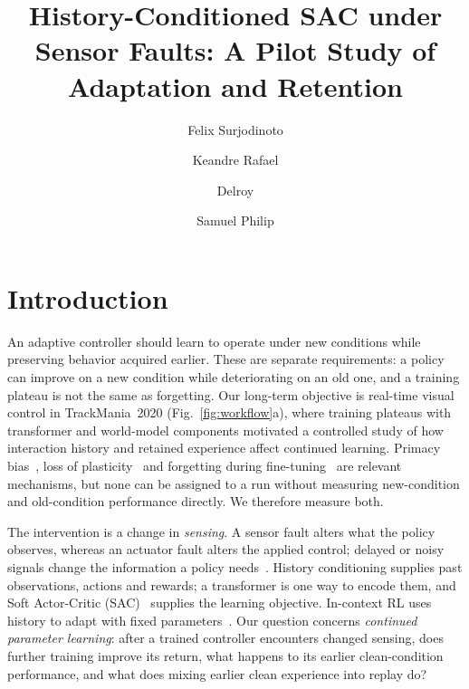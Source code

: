 \documentclass[runningheads]{llncs}
\begin{document}
\title{History-Conditioned SAC under Sensor Faults: A Pilot Study of Adaptation and Retention}
\author{Felix Surjodinoto \and Keandre Rafael \and Delroy \and Samuel Philip}
\authorrunning{\mbox{}}
\maketitle

\begin{abstract}

\end{abstract}

\section{Introduction}
An adaptive controller should learn to operate under new conditions while preserving behavior acquired earlier. These are separate requirements: a policy can improve on a new condition while deteriorating on an old one, and a training plateau is not the same as forgetting. Our long-term objective is real-time visual control in TrackMania~2020 (Fig.~\ref{fig:workflow}a), where training plateaus with transformer and world-model components motivated a controlled study of how interaction history and retained experience affect continued learning. Primacy bias~\cite{primacy}, loss of plasticity~\cite{plasticity} and forgetting during fine-tuning~\cite{finetuneforget} are relevant mechanisms, but none can be assigned to a run without measuring new-condition and old-condition performance directly. We therefore measure both.

The intervention is a change in \emph{sensing}. A sensor fault alters what the policy observes, whereas an actuator fault alters the applied control; delayed or noisy signals change the information a policy needs~\cite{signaldelay}. History conditioning supplies past observations, actions and rewards; a transformer is one way to encode them, and Soft Actor-Critic (SAC)~\cite{sac} supplies the learning objective. In-context RL uses history to adapt with fixed parameters~\cite{rl2,amago,ad}. Our question concerns \emph{continued parameter learning}: after a trained controller encounters changed sensing, does further training improve its return, what happens to its earlier clean-condition performance, and what does mixing earlier clean experience into replay do?
\end{document}
